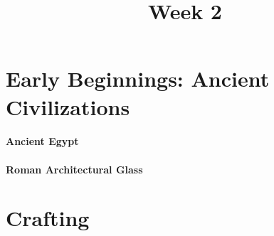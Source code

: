 \documentclass[11pt]{article}
\title{Week 2}
\date{}
\begin{document}
    \maketitle

    \section*{Early Beginnings: Ancient Civilizations}
        \paragraph{Ancient Egypt}
    
        \paragraph{Roman Architectural Glass}
    

    \section*{Crafting}
        \begin{itemize}
        \end{itemize}
\end{document}
